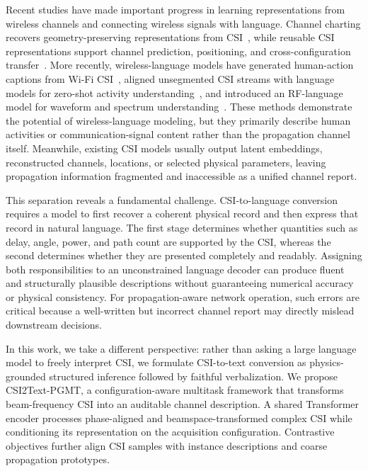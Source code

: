 \documentclass[conference]{IEEEtran}
\begin{document}
Recent studies have made important progress in learning representations from wireless channels and
connecting wireless signals with language. Channel charting recovers geometry-preserving
representations from CSI~\cite{studer2018charting}, while reusable CSI representations support
channel prediction, positioning, and cross-configuration transfer~\cite{liu2024wifo,palhares2025csi2vec}.
More recently, wireless-language models have generated human-action captions from Wi-Fi
CSI~\cite{wei2026wifi2cap}, aligned unsegmented CSI streams with language models for zero-shot
activity understanding~\cite{keya2026wirelesssense}, and introduced an RF-language model for waveform
and spectrum understanding~\cite{zou2026rfgpt}.
These methods demonstrate the potential of wireless-language modeling, but they primarily describe
human activities or communication-signal content rather than the propagation channel itself.
Meanwhile, existing CSI models usually output latent embeddings, reconstructed channels, locations,
or selected physical parameters, leaving propagation information fragmented and inaccessible as a
unified channel report.

This separation reveals a fundamental challenge. CSI-to-language conversion requires a model to
first recover a coherent physical record and then express that record in natural language. The first
stage determines whether quantities such as delay, angle, power, and path count are supported by the
CSI, whereas the second determines whether they are presented completely and readably. Assigning
both responsibilities to an unconstrained language decoder can produce fluent and structurally
plausible descriptions without guaranteeing numerical accuracy or physical consistency. For
propagation-aware network operation, such errors are critical because a well-written but incorrect
channel report may directly mislead downstream decisions.

In this work, we take a different perspective: rather than asking a large language model to freely
interpret CSI, we formulate CSI-to-text conversion as physics-grounded structured inference followed
by faithful verbalization. We propose CSI2Text-PGMT, a configuration-aware multitask framework that
transforms beam-frequency CSI into an auditable channel description. A shared Transformer encoder
processes phase-aligned and beamspace-transformed complex CSI while conditioning its representation
on the acquisition configuration. Contrastive objectives further align CSI samples with instance
descriptions and coarse propagation prototypes.
\end{document}
